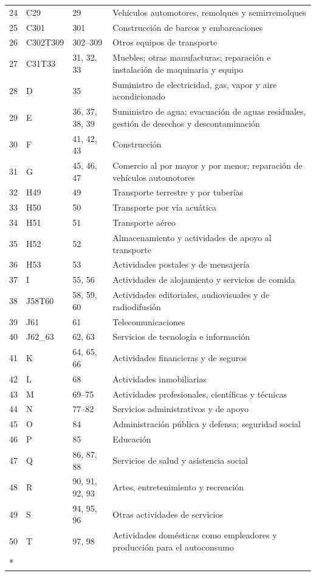 \begin{longtable}{@{} l l l p{9cm} @{} }
	24 & C29 & 29 & Vehículos automotores, remolques y semirremolques \\
	25 & C301 & 301 & Construcción de barcos y embarcaciones\\
	26 & C302T309 & 302--309& Otros equipos de transporte\\
	27 & C31T33 & 31, 32, 33 & Muebles; otras manufacturas; reparación e instalación de maquinaria y equipo \\
	28 & D & 35 & Suministro de electricidad, gas, vapor y aire acondicionado \\
	29 & E & 36, 37, 38, 39 & Suministro de agua; evacuación de aguas residuales, gestión de desechos y descontaminación \\
	30 & F & 41, 42, 43 & Construcción \\
	31 & G & 45, 46, 47 & Comercio al por mayor y por menor; reparación de vehículos automotores \\
	32 & H49 & 49 & Transporte terrestre y por tuberías \\
	33 & H50 & 50 & Transporte por vía acuática \\
	34 & H51 & 51 & Transporte aéreo \\
	35 & H52 & 52 & Almacenamiento y actividades de apoyo al transporte \\
	36 & H53 & 53 & Actividades postales y de mensajería \\
	37 & I & 55, 56 & Actividades de alojamiento y servicios de comida \\
	38 & J58T60 & 58, 59, 60 & Actividades editoriales, audiovisuales y de radiodifusión \\
	39 & J61 & 61 & Telecomunicaciones \\
	40 & J62\_63 & 62, 63 & Servicios de tecnología e información \\
	41 & K & 64, 65, 66 & Actividades financieras y de seguros \\
	42 & L & 68 & Actividades inmobiliarias \\
	43 & M & 69--75 & Actividades profesionales, científicas y técnicas \\
	44 & N & 77--82 & Servicios administrativos y de apoyo \\
	45 & O & 84 & Administración pública y defensa; seguridad social \\
	46 & P & 85 & Educación \\
	47 & Q & 86, 87, 88 & Servicios de salud y asistencia social \\
	48 & R & 90, 91, 92, 93 & Artes, entretenimiento y recreación \\
	49 & S & 94, 95, 96 & Otras actividades de servicios \\
	50 & T & 97, 98 & Actividades domésticas como empleadores y producción para el autoconsumo \\* \bottomrule
\end{longtable}